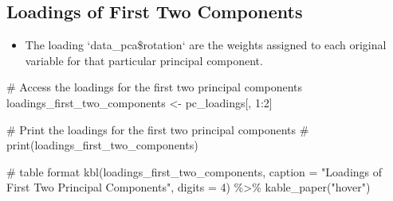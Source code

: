 \documentclass[
  letterpaper,
  DIV=11,
  numbers=noendperiod]{scrreprt}
\newenvironment{Shaded}{\begin{snugshade}}{\end{snugshade}}
\newcommand{\AttributeTok}[1]{\textcolor[rgb]{0.40,0.45,0.13}{#1}}
\newcommand{\CommentTok}[1]{\textcolor[rgb]{0.37,0.37,0.37}{#1}}
\newcommand{\DecValTok}[1]{\textcolor[rgb]{0.68,0.00,0.00}{#1}}
\newcommand{\FunctionTok}[1]{\textcolor[rgb]{0.28,0.35,0.67}{#1}}
\newcommand{\NormalTok}[1]{\textcolor[rgb]{0.00,0.23,0.31}{#1}}
\newcommand{\OtherTok}[1]{\textcolor[rgb]{0.00,0.23,0.31}{#1}}
\newcommand{\SpecialCharTok}[1]{\textcolor[rgb]{0.37,0.37,0.37}{#1}}
\newcommand{\StringTok}[1]{\textcolor[rgb]{0.13,0.47,0.30}{#1}}
\providecommand{\tightlist}{%
  \setlength{\itemsep}{0pt}\setlength{\parskip}{0pt}}\usepackage{longtable,booktabs,array}
\begin{document}
\hypertarget{loadings-of-first-two-components}{%
\subsection{Loadings of First Two
Components}\label{loadings-of-first-two-components}}

\begin{itemize}
\tightlist
\item
  The loading `data\_pca\$rotation` are the weights assigned to each
  original variable for that particular principal component.
\end{itemize}

\begin{Shaded}
\begin{Highlighting}[]
\CommentTok{\# Access the loadings for the first two principal components}
\NormalTok{loadings\_first\_two\_components }\OtherTok{\textless{}{-}}\NormalTok{ pc\_loadings[, }\DecValTok{1}\SpecialCharTok{:}\DecValTok{2}\NormalTok{]}

\CommentTok{\# Print the loadings for the first two principal components}
\CommentTok{\# print(loadings\_first\_two\_components)}

\CommentTok{\# table format}
\FunctionTok{kbl}\NormalTok{(loadings\_first\_two\_components, }
    \AttributeTok{caption =} \StringTok{"Loadings of First Two Principal Components"}\NormalTok{,}
    \AttributeTok{digits =} \DecValTok{4}\NormalTok{) }\SpecialCharTok{\%\textgreater{}\%}
  \FunctionTok{kable\_paper}\NormalTok{(}\StringTok{"hover"}\NormalTok{)}
\end{Highlighting}
\end{Shaded}
\end{document}
